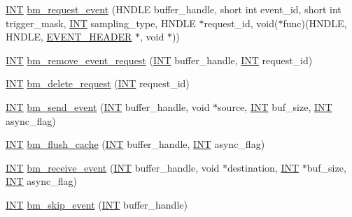 \begin{DoxyCompactItemize}
\item 
\hyperlink{vppg_8h_a392e62da233ed3e2f7c3fd4f487a3896}{INT} \hyperlink{group__bmfunctionc_gabf663d96482aeede1846487a7ada8184}{bm\_\-request\_\-event} (HNDLE buffer\_\-handle, short int event\_\-id, short int trigger\_\-mask, \hyperlink{vppg_8h_a392e62da233ed3e2f7c3fd4f487a3896}{INT} sampling\_\-type, HNDLE $\ast$request\_\-id, void($\ast$func)(HNDLE, HNDLE, \hyperlink{structEVENT__HEADER}{EVENT\_\-HEADER} $\ast$, void $\ast$))
\item 
\hyperlink{vppg_8h_a392e62da233ed3e2f7c3fd4f487a3896}{INT} \hyperlink{group__bmfunctionc_ga7810d29ac3894a4e299737bc7c7a2cf1}{bm\_\-remove\_\-event\_\-request} (\hyperlink{vppg_8h_a392e62da233ed3e2f7c3fd4f487a3896}{INT} buffer\_\-handle, \hyperlink{vppg_8h_a392e62da233ed3e2f7c3fd4f487a3896}{INT} request\_\-id)
\item 
\hyperlink{vppg_8h_a392e62da233ed3e2f7c3fd4f487a3896}{INT} \hyperlink{group__bmfunctionc_ga33221a55f8c90e411dea5eb34a2ee773}{bm\_\-delete\_\-request} (\hyperlink{vppg_8h_a392e62da233ed3e2f7c3fd4f487a3896}{INT} request\_\-id)
\item 
\hyperlink{vppg_8h_a392e62da233ed3e2f7c3fd4f487a3896}{INT} \hyperlink{group__bmfunctionc_ga499b14a246f8ab8d5a3b6ec77bfa9407}{bm\_\-send\_\-event} (\hyperlink{vppg_8h_a392e62da233ed3e2f7c3fd4f487a3896}{INT} buffer\_\-handle, void $\ast$source, \hyperlink{vppg_8h_a392e62da233ed3e2f7c3fd4f487a3896}{INT} buf\_\-size, \hyperlink{vppg_8h_a392e62da233ed3e2f7c3fd4f487a3896}{INT} async\_\-flag)
\item 
\hyperlink{vppg_8h_a392e62da233ed3e2f7c3fd4f487a3896}{INT} \hyperlink{group__bmfunctionc_ga9b74b8aa633c942682e642acba93c51d}{bm\_\-flush\_\-cache} (\hyperlink{vppg_8h_a392e62da233ed3e2f7c3fd4f487a3896}{INT} buffer\_\-handle, \hyperlink{vppg_8h_a392e62da233ed3e2f7c3fd4f487a3896}{INT} async\_\-flag)
\item 
\hyperlink{vppg_8h_a392e62da233ed3e2f7c3fd4f487a3896}{INT} \hyperlink{group__bmfunctionc_ga2fd8bb52ad5282be3ce076e84bc007fa}{bm\_\-receive\_\-event} (\hyperlink{vppg_8h_a392e62da233ed3e2f7c3fd4f487a3896}{INT} buffer\_\-handle, void $\ast$destination, \hyperlink{vppg_8h_a392e62da233ed3e2f7c3fd4f487a3896}{INT} $\ast$buf\_\-size, \hyperlink{vppg_8h_a392e62da233ed3e2f7c3fd4f487a3896}{INT} async\_\-flag)
\item 
\hyperlink{vppg_8h_a392e62da233ed3e2f7c3fd4f487a3896}{INT} \hyperlink{group__bmfunctionc_ga4a12567d843b2e1d20da58d8abfabb04}{bm\_\-skip\_\-event} (\hyperlink{vppg_8h_a392e62da233ed3e2f7c3fd4f487a3896}{INT} buffer\_\-handle)

\end{DoxyCompactItemize}
